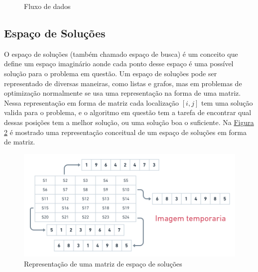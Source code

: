 %
\begin{figure}[ht]
    \centering
    \caption{Fluxo de dados}
    \label{fig:fluxo-design}
\end{figure}

%
    

\subsection{Espaço de Soluções}
O espaço de soluções (também chamado espaço de busca) é um conceito que define um espaço imaginário aonde cada ponto desse espaço é uma possível solução para o problema em questão. 
Um espaço de soluções pode ser representado de diversas maneiras, como listas e grafos, mas em problemas de optimização normalmente se usa uma representação na forma de uma matriz.\\
\indent Nessa representação em forma de matriz cada localização $[i, j]$ tem uma solução valida para o problema, e o algoritmo em questão tem a tarefa de encontrar qual dessas posições tem a melhor solução, ou uma solução boa o suficiente. Na 
\hyperref[fig:solution-space]{Figura \ref{fig:solution-space}} 
é mostrado uma representação conceitual de um espaço de soluções em forma de matriz.\hfill
            
\begin{figure}[ht]
    \centering
    \caption{Representação de uma matriz de espaço de soluções}
    \label{fig:solution-space}
    \includegraphics[width=\textwidth]{assets/solution.png}
\end{figure}

